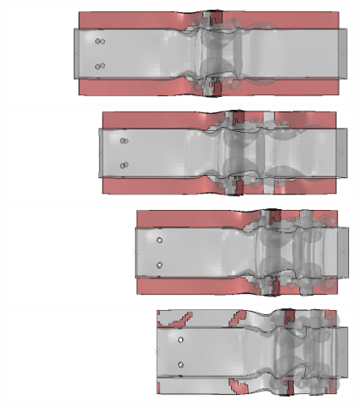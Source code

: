 \documentclass[
documentsize = a4, %
font = cmr, %
typesize = 11, %
printmode = true,
onehalfspacing = true,
language = en, %
titlepage = udciccp, %
degree = pt, %
dedication = true,
acknowledgements = true,
abstract-en = true,
abstract-es = false,
abstract-ga = false,
epigraphs = true,
toc = true,
lof = true,
lot = true,
frontmatterintoc = false,
notation = false,
minimal = false,
]{UDCthesis}
\begin{document}
\begin{figure}
	\centering
	\begin{minipage}[b]{.35\linewidth}
		\centering
		\begin{minipage}[b]{\linewidth}
		\includegraphics[width=\linewidth]{IMG_CUTRES/AR_RSB_8-25}
		\end{minipage}
		\quad
		\begin{minipage}[b]{\linewidth}
		\includegraphics[width=\linewidth]{IMG_CUTRES/AR_RSb_10-2}
		\end{minipage}
		\quad
		\begin{minipage}[b]{\linewidth}
		\includegraphics[width=\linewidth]{IMG_CUTRES/AR_RSb_13-2}
		\end{minipage}
		\quad
		\begin{minipage}[b]{\linewidth}
		\includegraphics[width=\linewidth]{IMG_CUTRES/AR_RSb_15}
		\end{minipage}
	\end{minipage}
	\quad
	\begin{minipage}[b]{.6\linewidth}

\end{minipage}
\end{figure}
\end{document}
